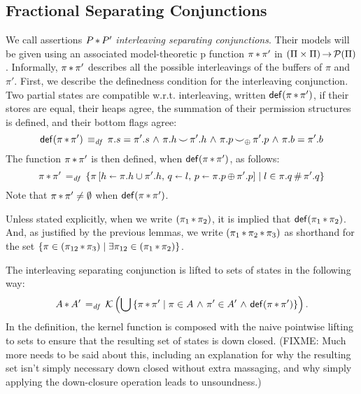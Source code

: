 \documentclass[11pt]{report}
\begin{document}
\subsection{Fractional Separating Conjunctions}

We call assertions $P \operatorname{\ast} P'$ \emph{interleaving separating conjunctions}. Their models will be given using an associated model-theoretic p function $\pi \operatorname{\ast} \pi'$ in $(\Pi \times \Pi) \operatorname{\rightarrow} \mathcal{P}(\Pi)$. Informally, $\pi \operatorname{\ast} \pi'$ describes all the possible interleavings of the buffers of $\pi$ and $\pi'$. First, we describe the definedness condition for the interleaving conjunction. Two partial states are compatible w.r.t. interleaving, written $\mathsf{def}(\pi \operatorname{\ast} \pi')$, if their stores are equal, their heaps agree, the summation of their permission structures is defined, and their bottom flags agree: \[ \mathsf{def}(\pi \operatorname{\ast} \pi') \operatorname{\;\equiv_{\mathit{df}}\;} \pi.s = \pi'.s \operatorname{\,\wedge\,} \pi.h \operatorname{\smile} \pi'.h \operatorname{\,\wedge\,} \pi.p \operatorname{\smile}_{\operatorname{\oplus}} \pi'.p \operatorname{\,\wedge\,} \pi.b = \pi'.b\]
The function $\pi \operatorname{\ast} \pi'$ is then defined, when $\mathsf{def}(\pi \operatorname{\ast} \pi')$, as follows:\[ 
	\pi \operatorname{\ast} \pi' \operatorname{\;=_{\mathit{df}}\;} \left\lbrace \pi \left[ h \shortleftarrow \pi.h \cup \pi'.h,\,q \shortleftarrow l,\, p \shortleftarrow \pi.p \operatorname{\oplus} \pi'.p \right] \mid l \in \pi.q \,\#\, \pi'.q \right\rbrace
\] Note that $\pi \operatorname{\ast} \pi' \neq \operatorname{\emptyset}$ when $\mathsf{def}(\pi \operatorname{\ast} \pi')$.

Unless stated explicitly, when we write $(\pi_1 \operatorname{\ast} \pi_2)$, it is implied that $\mathsf{def}(\pi_1 \operatorname{\ast} \pi_2)$. And, as justified by the previous lemmas, we write $(\pi_1 \operatorname{\ast} \pi_2 \operatorname{\ast} \pi_3)$ as shorthand for the set $\left\lbrace \pi \in (\pi_{12} \operatorname{\ast} \pi_3) \mid \exists \pi_{12} \in (\pi_1 \operatorname{\ast} \pi_2) \right\rbrace$. 

The interleaving separating conjunction is lifted to sets of states in the following way: \[ A \operatorname{\ast} A' \operatorname{\;=_{\mathit{df}}\;} \mathcal{K}\left(\bigcup \left\lbrace \pi \operatorname{\ast} \pi' \mid \pi \in A \operatorname{\,\wedge\,} \pi' \in A' \operatorname{\,\wedge\,} \mathsf{def}(\pi \operatorname{\ast} \pi') \right\rbrace\right).\] In the definition, the kernel function is composed with the naive pointwise lifting to sets to ensure that the resulting set of states is down closed. (FIXME: Much more needs to be said about this, including an explanation for why the resulting set isn't simply necessary down closed without extra massaging, and why simply applying the down-closure operation leads to unsoundness.)
\end{document}

